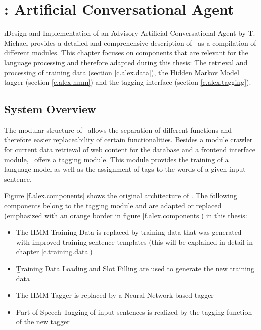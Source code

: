 \chapter{\Alex: Artificial Conversational Agent}\label{c.alex}
\i{Design and Implementation of an Advisory Artificial Conversational Agent} by T. Michael \cite{michael2016} provides a detailed and comprehensive description of \Alex\ as a compilation of different modules. This chapter focuses on components that are relevant for the language processing and therefore adapted during this thesis: The retrieval and processing of training data (section \ref{c.alex.data}), the Hidden Markov Model tagger (section \ref{c.alex.hmm}) and the tagging interface (section \ref{c.alex.tagging}).

\section{System Overview}\label{c.alex.overview}
The modular structure of \Alex\ allows the separation of different functions and therefore easier replaceability of certain functionalities. Besides a module crawler for current data retrieval of web content for the database and a frontend interface module, \Alex\ offers a tagging module. This module provides the training of a language model as well as the assignment of tags to the words of a given input sentence.

Figure \ref{f.alex.components} shows the original architecture of \Alex. The following components belong to the tagging module and are adapted or replaced (emphasized with an orange border in figure \ref{f.alex.components}) in this thesis:

\begin{itemize}
	\item The \b{HMM Training Data} is replaced by training data that was generated with improved training sentence templates (this will be explained in detail in chapter \ref{c.training.data})
	\item \b{Training Data Loading and Slot Filling} are used to generate the new training data
	\item The \b{HMM Tagger} is replaced by a Neural Network based tagger
	\item \b{Part of Speech Tagging} of input sentences is realized by the tagging function of the new tagger
\end{itemize}

